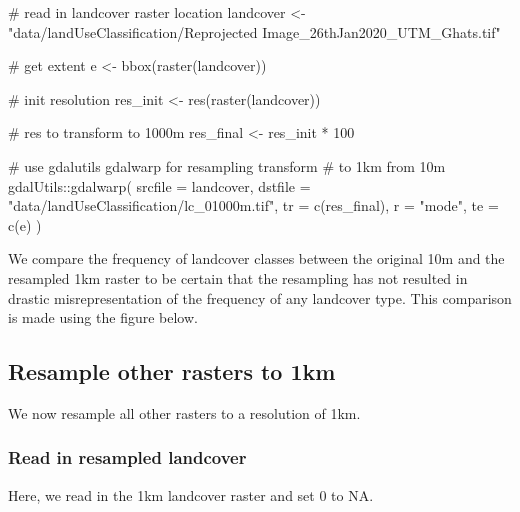\documentclass[]{article}
\newenvironment{Shaded}{}{}
\newcommand{\CommentTok}[1]{\textcolor[rgb]{0.00,0.50,0.00}{#1}}
\newcommand{\DataTypeTok}[1]{#1}
\newcommand{\DecValTok}[1]{#1}
\newcommand{\KeywordTok}[1]{\textcolor[rgb]{0.00,0.00,1.00}{#1}}
\newcommand{\NormalTok}[1]{#1}
\newcommand{\OperatorTok}[1]{#1}
\newcommand{\StringTok}[1]{\textcolor[rgb]{0.00,0.50,0.50}{#1}}
\begin{document}
\begin{Shaded}
\begin{Highlighting}[]
\CommentTok{# read in landcover raster location}
\NormalTok{landcover <-}\StringTok{ "data/landUseClassification/Reprojected Image_26thJan2020_UTM_Ghats.tif"}

\CommentTok{# get extent}
\NormalTok{e <-}\StringTok{ }\KeywordTok{bbox}\NormalTok{(}\KeywordTok{raster}\NormalTok{(landcover))}

\CommentTok{# init resolution}
\NormalTok{res_init <-}\StringTok{ }\KeywordTok{res}\NormalTok{(}\KeywordTok{raster}\NormalTok{(landcover))}

\CommentTok{# res to transform to 1000m}
\NormalTok{res_final <-}\StringTok{ }\NormalTok{res_init }\OperatorTok{*}\StringTok{ }\DecValTok{100}

\CommentTok{# use gdalutils gdalwarp for resampling transform}
\CommentTok{# to 1km from 10m}
\NormalTok{gdalUtils}\OperatorTok{::}\KeywordTok{gdalwarp}\NormalTok{(}
  \DataTypeTok{srcfile =}\NormalTok{ landcover,}
  \DataTypeTok{dstfile =} \StringTok{"data/landUseClassification/lc_01000m.tif"}\NormalTok{,}
  \DataTypeTok{tr =} \KeywordTok{c}\NormalTok{(res_final), }\DataTypeTok{r =} \StringTok{"mode"}\NormalTok{, }\DataTypeTok{te =} \KeywordTok{c}\NormalTok{(e)}
\NormalTok{)}
\end{Highlighting}
\end{Shaded}

We compare the frequency of landcover classes between the original 10m and the resampled 1km raster to be certain that the resampling has not resulted in drastic misrepresentation of the frequency of any landcover type. This comparison is made using the figure below.

\hypertarget{resample-other-rasters-to-1km}{%
\subsection{Resample other rasters to 1km}\label{resample-other-rasters-to-1km}}

We now resample all other rasters to a resolution of 1km.

\hypertarget{read-in-resampled-landcover}{%
\subsubsection{Read in resampled landcover}\label{read-in-resampled-landcover}}

Here, we read in the 1km landcover raster and set 0 to NA.
\end{document}
